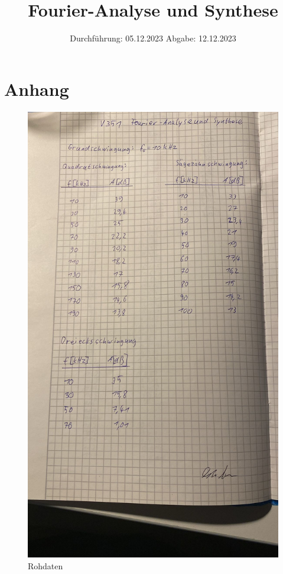 

\subject{V351}
\title{Fourier-Analyse und Synthese}
\date{%
  Durchführung: 05.12.2023
  \hspace{3em}
  Abgabe: 12.12.2023
}



\maketitle
\thispagestyle{empty}
\tableofcontents
\newpage






\printbibliography{}

\section{Anhang}
\begin{figure}
  \includegraphics[width=\textwidth]{Bilder/data.jpg}
  \caption{Rohdaten}
\end{figure}

